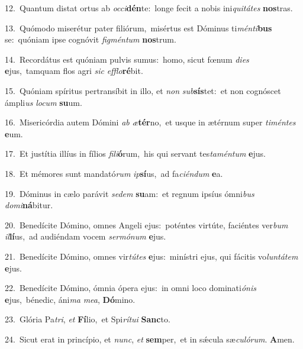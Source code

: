 {\numbfont\textcolor{\numbcolor}{12.}}~Quantum distat ortus ab \textit{oc}\-\textit{ci}\textbf{dén}te:~\star longe fecit a nobis ini\-\textit{qui}\-\textit{tá}\textit{tes} \textbf{nos}\-tras.\par
{\numbfont\textcolor{\numbcolor}{13.}}~Quómodo miserétur pater filiórum,~\dagger misértus est Dóminus ti\-\textit{mén}\-\textit{ti}\textbf{bus} se:~\star quóniam ipse cognóvit \textit{fig}\-\textit{mén}\textit{tum} \textbf{nos}\-trum.\par
{\numbfont\textcolor{\numbcolor}{14.}}~Recordátus est quóniam pulvis sumus:~\dagger homo, sicut fœnum \textit{di}\-\textit{es} \textbf{e}\-jus,~\star tamquam flos agri \textit{sic} \textit{ef}\-\textit{flo}\textbf{ré}bit.\par
{\numbfont\textcolor{\numbcolor}{15.}}~Quóniam spíritus pertransíbit in illo, et \textit{non} \textit{sub}\-\textbf{sís}tet:~\star et non cognóscet ámpli\textit{us} \textit{lo}\-\textit{cum} \textbf{su}\-um.\par
{\numbfont\textcolor{\numbcolor}{16.}}~Misericórdia autem Dómini \textit{ab} \textit{æ}\-\textbf{tér}no,~\star et usque in ætérnum super \textit{ti}\-\textit{mén}\textit{tes} \textbf{e}\-um.\par
{\numbfont\textcolor{\numbcolor}{17.}}~Et justítia illíus in fílios \textit{fi}\-\textit{li}\textbf{ó}rum,~\star his qui servant tes\-\textit{ta}\-\textit{mén}\textit{tum} \textbf{e}\-jus.\par
{\numbfont\textcolor{\numbcolor}{18.}}~Et mémores sunt mandató\textit{rum} \textit{ip}\-\textbf{sí}us,~\star ad fa\-\textit{ci}\-\textit{én}\textit{dum} \textbf{e}\-a.\par
{\numbfont\textcolor{\numbcolor}{19.}}~Dóminus in cælo parávit \textit{se}\-\textit{dem} \textbf{su}\-am:~\star et regnum ipsíus ómni\textit{bus} \textit{do}\-\textit{mi}\textbf{ná}bitur.\par
{\numbfont\textcolor{\numbcolor}{20.}}~Benedícite Dómino, omnes Angeli ejus:~\dagger poténtes virtúte, faciéntes ver\textit{bum} \textit{il}\-\textbf{lí}us,~\star ad audiéndam vocem \textit{ser}\-\textit{mó}\textit{num} \textbf{e}\-jus.\par
{\numbfont\textcolor{\numbcolor}{21.}}~Benedícite Dómino, omnes vir\-\textit{tú}\-\textit{tes} \textbf{e}\-jus:~\star minístri ejus, qui fácitis vo\-\textit{lun}\-\textit{tá}\textit{tem} \textbf{e}\-jus.\par
{\numbfont\textcolor{\numbcolor}{22.}}~Benedícite Dómino, ómnia ópera ejus:~\dagger in omni loco dominati\-\textit{ó}\-\textit{nis} \textbf{e}\-jus,~\star bénedic, áni\textit{ma} \textit{me}\-\textit{a}, \textbf{Dó}\-mino.\par
{\numbfont\textcolor{\numbcolor}{23.}}~Glória Pa\-\textit{tri}\-, \textit{et} \textbf{Fí}\-lio,~\star et Spi\-\textit{rí}\-\textit{tu}\textit{i} \textbf{Sanc}\-to.\par
{\numbfont\textcolor{\numbcolor}{24.}}~Sicut erat in princípio, et \textit{nunc}\-, \textit{et} \textbf{sem}\-per,~\star et in sǽcula sæ\-\textit{cu}\-\textit{ló}\textit{rum}. \textbf{A}\-men.\par
